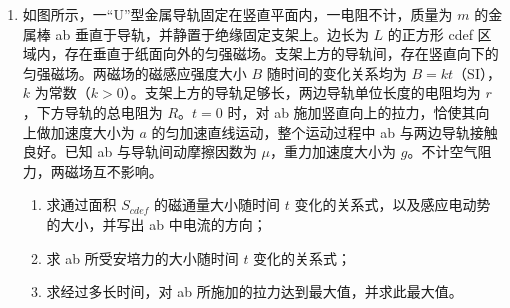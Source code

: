 \documentclass[\gkver]{gaokaozhenti}
\begin{document}
\begin{enumerate}
\item
如图所示，一“U”型金属导轨固定在竖直平面内，一电阻不计，质量为 $m$ 的金属棒 ab 垂直于导轨，并静置于绝缘固定支架上。边长为 $L$ 的正方形 cdef 区域内，存在垂直于纸面向外的匀强磁场。支架上方的导轨间，存在竖直向下的匀强磁场。两磁场的磁感应强度大小 $B$ 随时间的变化关系均为 $B = kt$（SI），$k$ 为常数（$k > 0$）。支架上方的导轨足够长，两边导轨单位长度的电阻均为 $r$，下方导轨的总电阻为 $R$。$t = 0$ 时，对 ab 施加竖直向上的拉力，恰使其向上做加速度大小为 $a$ 的匀加速直线运动，整个运动过程中 ab 与两边导轨接触良好。已知 ab 与导轨间动摩擦因数为 $\mu$，重力加速度大小为 $g$。不计空气阻力，两磁场互不影响。
\begin{enumerate}
	\item
	求通过面积 $S_{cdef}$ 的磁通量大小随时间 $t$ 变化的关系式，以及感应电动势的大小，并写出 ab 中电流的方向；
	\item
	求 ab 所受安培力的大小随时间 $t$ 变化的关系式；
	\item
	求经过多长时间，对 ab 所施加的拉力达到最大值，并求此最大值。
\end{enumerate}

\end{enumerate}
\end{document}
